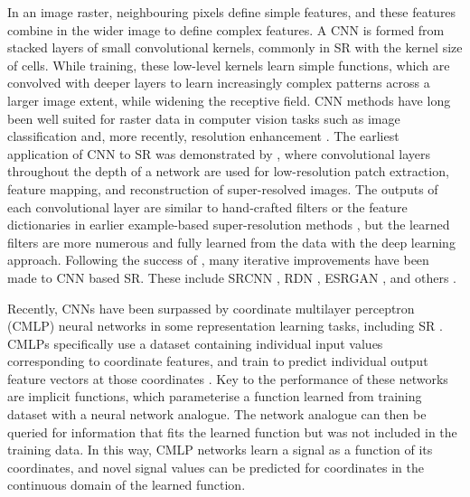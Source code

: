 In an image raster, neighbouring pixels define simple features, and these features combine in the wider image to define complex features.
A CNN is formed from stacked layers of small convolutional kernels, commonly in SR with the kernel size of  cells.
While training, these low-level kernels learn simple functions, which are convolved with deeper layers to learn increasingly complex patterns across a larger image extent, while widening the receptive field.
CNN methods have long been well suited for raster data in computer vision tasks such as image classification \parencite[e.g.][]{simonyanVeryDeepConvolutional2015} and, more recently, resolution enhancement \parencite[e.g.][]{zhangResidualDenseNetwork2018}.
The earliest application of CNN to SR was demonstrated by \textcite{dongLearningDeepConvolutional2014}, where convolutional layers throughout the depth of a network are used for low-resolution patch extraction, feature mapping, and reconstruction of super-resolved images.
The outputs of each convolutional layer are similar to hand-crafted filters or the feature dictionaries in earlier example-based super-resolution methods \parencite{freemanExamplebasedSuperresolution2002}, but the learned filters are more numerous and fully learned from the data with the deep learning approach.
Following the success of \parencite{dongLearningDeepConvolutional2014}, many iterative improvements have been made to CNN based SR\@.
These include SRCNN \parencite{dongImageSuperresolutionUsing2016}, RDN \parencite{zhangResidualDenseNetwork2018}, ESRGAN \parencite{wangESRGANEnhancedSuperresolution2018}, and others \parencite{ledigPhotorealisticSingleImage2017,limEnhancedDeepResidual2017}.

Recently, CNNs have been surpassed by coordinate multilayer perceptron (CMLP) neural networks in some representation learning tasks, including SR \parencite{chenLearningContinuousImage2021}.
CMLPs specifically use a dataset containing individual input values corresponding to coordinate features, and train to predict individual output feature vectors at those coordinates \parencite[e.g.][]{mildenhallNeRFRepresentingScenes2020}.
Key to the performance of these networks are implicit functions, which parameterise a function learned from training dataset with a neural network analogue.
The network analogue can then be queried for information that fits the learned function but was not included in the training data.
In this way, CMLP networks learn a signal as a function of its coordinates, and novel signal values can be predicted for coordinates in the continuous domain of the learned function.

